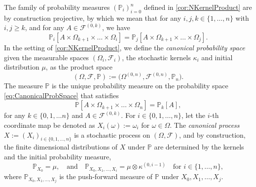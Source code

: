 \documentclass[
    a4paper,
    11pt,
    bibliography=totoc,
    listof=totoc,      
    headinclude=true,
    cleardoublepage=empty,
]{scrbook}
\theoremstyle{plain}
\theoremstyle{definition}
\theoremstyle{remark}
\newcommand{\PM}{\mathbb P}
\begin{document}
The family of probability measures ${(\PM_i)}^n_{i=0}$ defined in
\cref{cor:NKernelProduct} are by construction projective, by which we mean 
that for any $i,j,k\in\{1,\dots, n\}$ with $i,j\geq k$, and for any $A\in
\mathcal{F}^{(0,k)}$, we have
\[
    \PM_i[A\times\Omega_{k+1}\times\dots\times\Omega_i] 
    = 
    \PM_j[A\times\Omega_{k+1}\times\dots\times\Omega_j].
\]
%
In the setting of \cref{cor:NKernelProduct}, we define the \textit{canonical 
probability space} given the measurable spaces $(\Omega_i,\mathcal{F}_i)$, the 
stochastic kernels $\kappa_i$ and initial distribution $\mu$, as the product space
\begin{equation}
\label{eq:CanonicalProbSpace}
    (\Omega, \mathcal{F}, \PM) 
    := 
    \bigl(\Omega^{(0,n)}, \mathcal{F}^{(0,n)}, \PM_n\bigr).
\end{equation}
The measure $\PM$ is the unique probability measure on the probability space 
\eqref{eq:CanonicalProbSpace} that satisfies 
\[
    \PM[A\times \Omega_{k+1}\times\dots\times\Omega_n] = \PM_k[A],
\]
for any $k\in\{0,1,\dots n\}$ and $A\in\mathcal{F}^{(0,k)}$. For $i\in\{0,1,
\dots,n\}$, let the $i$-th coordinate map be denoted as $X_i(\omega) := 
\omega_i$ for $\omega\in\Omega$. The \textit{canonical process} 
$X:= (X_i)_{i\in\{0,1,\dots,n\}}$ is a stochastic process on $(\Omega,
\mathcal{F})$, and by construction, the finite dimensional distributions of 
$X$ under $\PM$ are determined by the kernels and the initial
probability measure,
\begin{equation}
    \PM_{X_0} = \mu, \quad \text{and} \quad
    \PM_{X_0, X_1, \dots, X_i} = \mu\otimes\kappa^{(0,i-1)}
    \quad \text{for } i \in\{1,\dots,n\},    
\end{equation}
where $\PM_{X_0, X_1, \dots, X_j}$ is the push-forward measure of $\PM$ under
$X_0,X_1,\dots, X_j$. 
\end{document}
